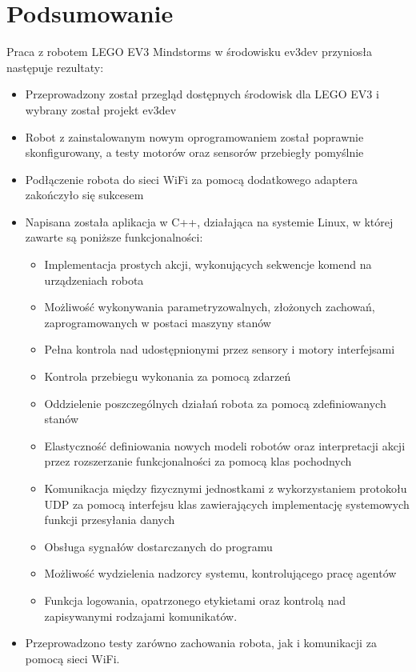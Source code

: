 \chapter{Podsumowanie}
\label{ch:podsumowanie}

Praca z robotem LEGO EV3 Mindstorms w środowisku ev3dev przyniosła następuje rezultaty:

\begin{itemize}
    \item Przeprowadzony został przegląd dostępnych środowisk dla LEGO EV3 i wybrany został projekt ev3dev
    \item Robot z zainstalowanym nowym oprogramowaniem został poprawnie skonfigurowany, a testy motorów oraz sensorów przebiegły pomyślnie
    \item Podłączenie robota do sieci WiFi za pomocą dodatkowego adaptera zakończyło się sukcesem
    \item Napisana została aplikacja w C++, działająca na systemie Linux, w której zawarte są poniższe funkcjonalności:
    \begin{itemize}
        \item Implementacja prostych akcji, wykonujących sekwencje komend na urządzeniach robota
        \item Możliwość wykonywania parametryzowalnych, złożonych zachowań, zaprogramowanych w postaci maszyny stanów
        \item Pełna kontrola nad udostępnionymi przez sensory i motory interfejsami
        \item Kontrola przebiegu wykonania za pomocą zdarzeń
        \item Oddzielenie poszczególnych działań robota za pomocą zdefiniowanych stanów
        \item Elastyczność definiowania nowych modeli robotów oraz interpretacji akcji przez rozszerzanie funkcjonalności za pomocą klas pochodnych
        \item Komunikacja między fizycznymi jednostkami z wykorzystaniem protokołu UDP za pomocą interfejsu klas zawierających implementację systemowych funkcji przesyłania danych
        \item Obsługa sygnałów dostarczanych do programu
        \item Możliwość wydzielenia nadzorcy systemu, kontrolującego pracę agentów
        \item Funkcja logowania, opatrzonego etykietami oraz kontrolą nad zapisywanymi rodzajami komunikatów.
    \end{itemize}
    \item Przeprowadzono testy zarówno zachowania robota, jak i komunikacji za pomocą sieci WiFi.
\end{itemize}


